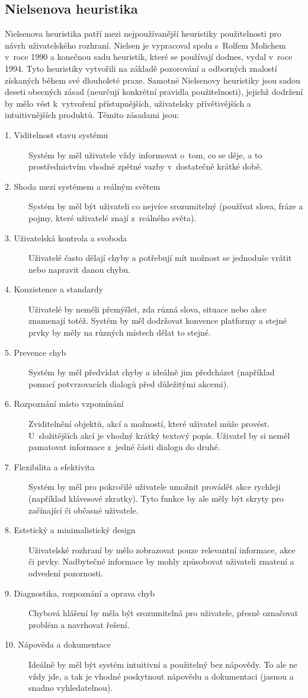 \documentclass[thesis=M,czech]{FITthesis}[2019/12/23]
\begin{document}
\subsection{Nielsenova heuristika \cite{nielsen-1, nielsen-2}}
\label{doc:nielsen}
Nielsenova heuristika patří mezi nejpoužívanější heuristiky použitelnosti pro návrh uživatelského rozhraní. Nielsen je vypracoval spolu s~Rolfem Molichem v~roce 1990 a konečnou sadu heuristik, které se používají dodnes, vydal v~roce 1994. Tyto heuristiky vytvořili na základě pozorování a odborných znalostí získaných během své dlouholeté praxe. Samotné Nielsenovy heuristiky jsou sadou deseti obecných zásad (neurčují konkrétní pravidla použitelnosti), jejichž dodržení by mělo vést k~vytvoření přístupnějších, uživatelsky přívětivějších a intuitivnějších produktů. Těmito zásadami jsou:

\begin{description}
    \item[1. Viditelnost stavu systému] Systém by měl uživatele vždy informovat o~tom, co se děje, a to prostřednictvím vhodné zpětné vazby v~dostatečně krátké době.
    \item[2. Shoda mezi systémem a reálným světem] Systém by měl být uživateli co nejvíce srozumitelný (používat slova, fráze a pojmy, které uživatelé znají z~reálného světa).
    \item[3. Uživatelská kontrola a svoboda] Uživatelé často dělají chyby a potřebují mít možnost se jednoduše vrátit nebo napravit danou chybu.
    \item[4. Konzistence a standardy] Uživatelé by neměli přemýšlet, zda různá slova, situace nebo akce znamenají totéž. Systém by měl dodržovat konvence platformy a stejné prvky by měly na různých místech dělat to stejné.
    \item[5. Prevence chyb] Systém by měl předvídat chyby a ideálně jim předcházet (například pomocí potvrzovacích dialogů před důležitými akcemi).
    \item[6. Rozpoznání místo vzpomínání] Zviditelnění objektů, akcí a možností, které uživatel může provést. U~složitějších akcí je vhodný krátký textový popis. Uživatel by si neměl pamatovat informace z~jedné části dialogu do druhé.
    \item[7. Flexibilita a efektivita] Systém by měl pro pokročilé uživatele umožnit provádět akce rychleji (například klávesové zkratky). Tyto funkce by ale měly být skryty pro začínající či občasné uživatele.
    \item[8. Estetický a minimalistický design] Uživatelské rozhraní by mělo zobrazovat pouze relevantní informace, akce či prvky. Nadbytečné informace by mohly způsobovat uživateli zmatení a odvedení pozornosti. 
    \item[9. Diagnostika, rozpoznání a oprava chyb] Chybová hlášení by měla být srozumitelná pro uživatele, přesně označovat problém a navrhovat řešení.
    \item[10. Nápověda a dokumentace] Ideálně by měl být systém intuitivní a použitelný bez nápovědy. To ale ne vždy jde, a tak je vhodné poskytnout nápovědu a dokumentaci (jasnou a snadno vyhledatelnou).
\end{description}
\end{document}
